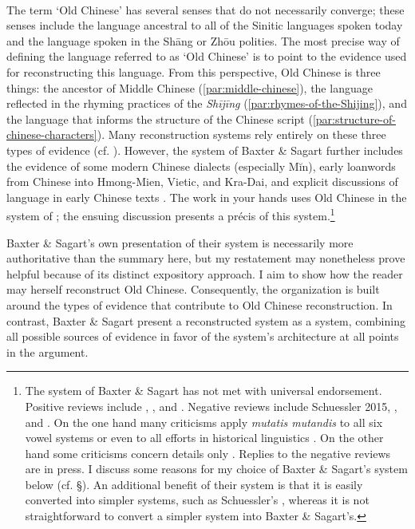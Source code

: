 \paragraph{} The term `Old Chinese' has several senses that do not necessarily
converge; these senses include the language ancestral to all of the
Sinitic languages spoken today and the language spoken in the Shāng or
Zhōu polities. The most precise way of defining the language referred to
as `Old Chinese' is to point to the evidence used for reconstructing
this language. From this per­spec­tive, Old Chinese is three things: the
ancestor of Middle Chinese (\ref{par:middle-chinese}), the language reflected in the rhyming
practices of the \emph{Shījīng} (\ref{par:rhymes-of-the-Shijing}), and the language that informs the
structure of the Chinese script (\ref{par:structure-of-chinese-characters}). Many reconstruction systems rely
entirely on these three types of evidence (cf. 
\cite[11]{Schuessler2009minimal}).
However, the system of Baxter \& Sagart further includes the evidence of
some modern Chinese dialects (especially Mĭn), early loanwords from
Chinese into Hmong-Mien, Vietic, and Kra-Dai, and explicit discussions
of language in early Chinese texts 
\citep[2-4]{Baxter2014OldChinese}. The
work in your hands uses Old Chinese in the system of 
\citet[]{Baxter2014OldChinese}; the ensuing discussion presents a précis of this
system.\footnote{The system of Baxter \& Sagart has not met with
  universal endorsement. Positive reviews include \cite{Starostin2015},
  \cite{Goldstein2015}, and 
  \cite{Hill2017OCreview}.
  Negative reviews include
  Schuessler 2015, 
  \cite{Ho2016}, and 
   \cite[]{Harbsmeier2016}. On the one hand many
  criticisms apply \emph{mutatis mutandis} to all six vowel systems \citep[esp. pp. 183-184]{Ho2016} or even to all efforts in historical
  linguistics \citep[esp. pp. 484-487]{Harbsmeier2016}. On the other hand
  some criticisms concern details only
  \citep[]{Schuessler2015BSrv}. Replies to the
  negative reviews are in press. I discuss some reasons for my choice of
  Baxter \& Sagart's system below (cf. §). An additional benefit of
  their system is that it is easily converted into simpler systems, such
  as Schuessler's 
  \citeyearpar[]{Schuessler2009minimal}, whereas it is not straightforward to convert a
  simpler system into Baxter \& Sagart's.}

Baxter \& Sagart's own presentation of their system is necessarily more
authoritative than the summary here, but my restatement may nonetheless
prove helpful because of its distinct expository approach. I aim to show
how the reader may herself reconstruct Old Chinese. Consequently, the
organization is built around the types of evidence that contribute to
Old Chinese reconstruction. In contrast, Baxter \& Sagart present a
reconstructed system as a system, combining all possible sources of
evidence in favor of the system's architecture at all points in the
argument.


